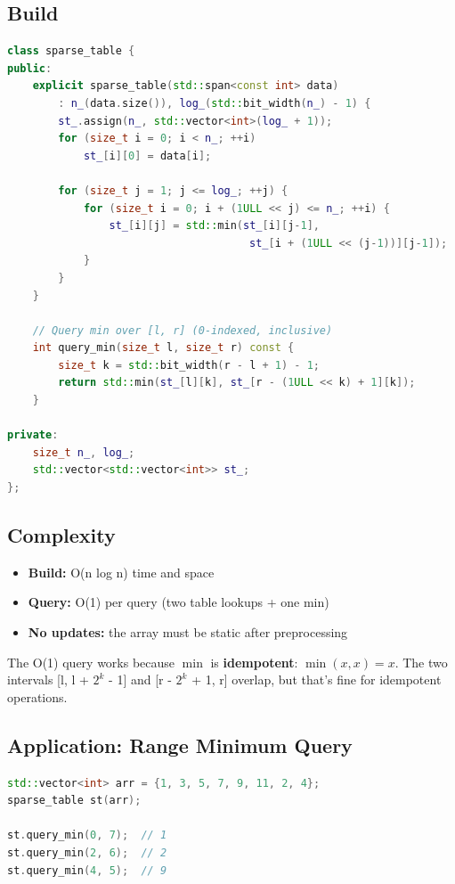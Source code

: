 \subsection{Build}

\begin{lstlisting}[language=C++]
class sparse_table {
public:
    explicit sparse_table(std::span<const int> data)
        : n_(data.size()), log_(std::bit_width(n_) - 1) {
        st_.assign(n_, std::vector<int>(log_ + 1));
        for (size_t i = 0; i < n_; ++i)
            st_[i][0] = data[i];

        for (size_t j = 1; j <= log_; ++j) {
            for (size_t i = 0; i + (1ULL << j) <= n_; ++i) {
                st_[i][j] = std::min(st_[i][j-1],
                                      st_[i + (1ULL << (j-1))][j-1]);
            }
        }
    }

    // Query min over [l, r] (0-indexed, inclusive)
    int query_min(size_t l, size_t r) const {
        size_t k = std::bit_width(r - l + 1) - 1;
        return std::min(st_[l][k], st_[r - (1ULL << k) + 1][k]);
    }

private:
    size_t n_, log_;
    std::vector<std::vector<int>> st_;
};
\end{lstlisting}

\subsection{Complexity}

\begin{itemize}
\item \textbf{Build:} O(n log n) time and space
\item \textbf{Query:} O(1) per query (two table lookups + one min)
\item \textbf{No updates:} the array must be static after preprocessing
\end{itemize}

The O(1) query works because $\min$ is \textbf{idempotent}: $\min(x, x) = x$. The two intervals [l, l + $2^k$ - 1] and [r - $2^k$ + 1, r] overlap, but that's fine for idempotent operations.

\subsection{Application: Range Minimum Query}

\begin{lstlisting}[language=C++]
std::vector<int> arr = {1, 3, 5, 7, 9, 11, 2, 4};
sparse_table st(arr);

st.query_min(0, 7);  // 1
st.query_min(2, 6);  // 2
st.query_min(4, 5);  // 9
\end{lstlisting}

